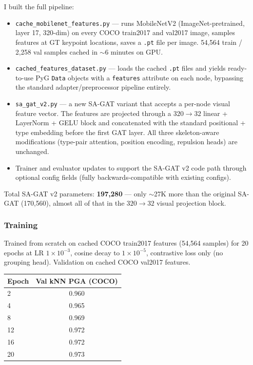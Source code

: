 I built the full pipeline:
\begin{itemize}
    \item \texttt{cache\_mobilenet\_features.py} --- runs MobileNetV2 (ImageNet-pretrained, layer 17, 320-dim) on every COCO train2017 and val2017 image, samples features at GT keypoint locations, saves a \texttt{.pt} file per image. 54,564 train / 2,258 val samples cached in $\sim$6 minutes on GPU.
    \item \texttt{cached\_features\_dataset.py} --- loads the cached \texttt{.pt} files and yields ready-to-use PyG \texttt{Data} objects with a \texttt{features} attribute on each node, bypassing the standard adapter/preprocessor pipeline entirely.
    \item \texttt{sa\_gat\_v2.py} --- a new SA-GAT variant that accepts a per-node visual feature vector. The features are projected through a $320 \to 32$ linear + LayerNorm + GELU block and concatenated with the standard positional + type embedding before the first GAT layer. All three skeleton-aware modifications (type-pair attention, position encoding, repulsion heads) are unchanged.
    \item Trainer and evaluator updates to support the SA-GAT v2 code path through optional config fields (fully backwards-compatible with existing configs).
\end{itemize}

Total SA-GAT v2 parameters: \textbf{197,280} --- only $\sim$27K more than the original SA-GAT (170,560), almost all of that in the $320 \to 32$ visual projection block.

\subsubsection{Training}

Trained from scratch on cached COCO train2017 features (54,564 samples) for 20 epochs at LR $1 \times 10^{-3}$, cosine decay to $1 \times 10^{-5}$, contrastive loss only (no grouping head). Validation on cached COCO val2017 features.

\begin{center}
\begin{tabular}{lc}
\hline
\textbf{Epoch} & \textbf{Val kNN PGA (COCO)} \\
\hline
2 & 0.960 \\
4 & 0.965 \\
8 & 0.969 \\
12 & 0.972 \\
16 & 0.972 \\
20 & 0.973 \\
\hline
\end{tabular}
\end{center}

